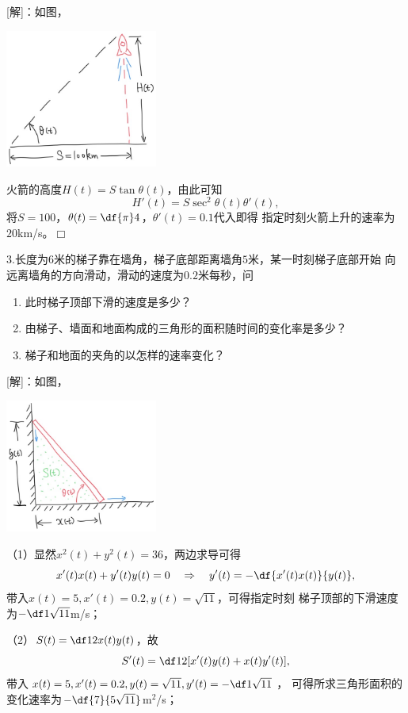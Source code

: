 [解]：如图，
\begin{center}
	\includegraphics[width=5cm]{./images/ch2/Rocket.jpg}
\end{center}
火箭的高度$H(t)=S\tan\theta(t)$，由此可知
$$H'(t)=S\sec^2\theta(t)\theta'(t),$$
将$S=100$，$\theta(t)=\df{\pi}4$，$\theta'(t)=0.1$代入即得
指定时刻火箭上升的速率为$20$km/s。\hfill$\Box$

\bigskip

3.长度为$6$米的梯子靠在墙角，梯子底部距离墙角$5$米，某一时刻梯子底部开始
向远离墙角的方向滑动，滑动的速度为$0.2$米每秒，问
\begin{enumerate}[(1)]
  \setlength{\itemindent}{1cm}
  \item 此时梯子顶部下滑的速度是多少？
  \item 由梯子、墙面和地面构成的三角形的面积随时间的变化率是多少？
  \item 梯子和地面的夹角的以怎样的速率变化？
\end{enumerate}

[解]：如图，
\begin{center}
	\includegraphics[width=5cm]{./images/ch2/ladder.jpg}
\end{center}
（1）显然$x^2(t)+y^2(t)=36$，两边求导可得
$$x'(t)x(t)+y'(t)y(t)=0\quad
\Rightarrow\quad y'(t)=-\df{x'(t)x(t)}{y(t)},$$
带入$x(t)=5,x'(t)=0.2,y(t)=\sqrt{11}$，可得指定时刻
梯子顶部的下滑速度为$-\df1{\sqrt{11}}$m/s；

（2）$S(t)=\df12x(t)y(t)$，故
$$S'(t)=\df12[x'(t)y(t)+x(t)y'(t)],$$
带入$x(t)=5,x'(t)=0.2,y(t)=\sqrt{11},y'(t)=-\df1{\sqrt{11}}$，
可得所求三角形面积的变化速率为$-\df{7}{5\sqrt{11}}$m$^2$/s；


